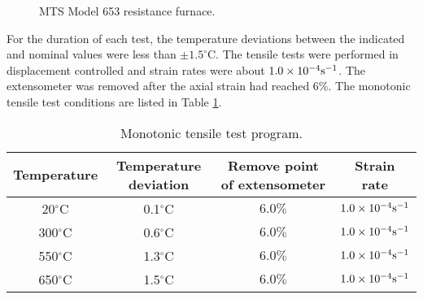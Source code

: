 
\begin{figure}[!htp]
\caption{MTS Model 653 resistance furnace.}
\label{Fig:Furnace653_1}
\end{figure}

For the duration of each test, the temperature deviations between the indicated and nominal values were less than $\pm1.5^{\circ}$C.
The tensile tests were performed in displacement controlled and strain rates were about $1.0\times 10^{-4}\rm{s}^{-1}$.
The extensometer was removed after the axial strain had reached 6\%.
The monotonic tensile test conditions are listed in Table \ref{tab:TensionLoadingConditions}.
\begin{table}[htbp]
  \centering
  \caption{Monotonic tensile test program.}
    \begin{tabular}{cccc}
    \toprule
    Temperature & Temperature deviation & Remove point of extensometer  & Strain rate  \\
    \midrule
    20$^{\circ}$C  & 0.1$^{\circ}$C & $6.0\%$ & $1.0\times 10^{-4} \rm{s}^{-1}$ \\
    300$^{\circ}$C & 0.6$^{\circ}$C & $6.0\%$ & $1.0\times 10^{-4} \rm{s}^{-1}$ \\
    550$^{\circ}$C & 1.3$^{\circ}$C & $6.0\%$ & $1.0\times 10^{-4} \rm{s}^{-1}$ \\
    650$^{\circ}$C & 1.5$^{\circ}$C & $6.0\%$ & $1.0\times 10^{-4} \rm{s}^{-1}$ \\
    \bottomrule
    \end{tabular}%
  \label{tab:TensionLoadingConditions}%
\end{table}%

